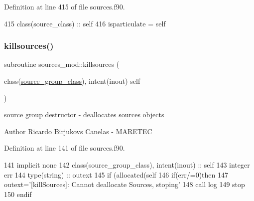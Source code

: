 Definition at line 415 of file sources.\+f90.


\begin{DoxyCode}
415     \textcolor{keywordtype}{class}(source\_class) :: self
416     isparticulate = self%
\end{DoxyCode}
\mbox{\label{namespacesources__mod_aee745aa084adcfa41ecfc3469b90aa8e}} 
\subsubsection{\texorpdfstring{killsources()}{killsources()}}
{\footnotesize\ttfamily subroutine sources\+\_\+mod\+::killsources (\begin{DoxyParamCaption}\item[{class(\mbox{\hyperlink{structsources__mod_1_1source__group__class}{source\+\_\+group\+\_\+class}}), intent(inout)}]{self }\end{DoxyParamCaption})\hspace{0.3cm}{\ttfamily [private]}}



source group destructor -\/ deallocates sources objects 

\begin{DoxyAuthor}{Author}
Ricardo Birjukovs Canelas -\/ M\+A\+R\+E\+T\+EC 
\end{DoxyAuthor}


Definition at line 141 of file sources.\+f90.


\begin{DoxyCode}
141     \textcolor{keywordtype}{implicit none}
142     \textcolor{keywordtype}{class}(source\_group\_class), \textcolor{keywordtype}{intent(inout)} :: self
143     \textcolor{keywordtype}{integer} err
144     \textcolor{keywordtype}{type}(string) :: outext
145     \textcolor{keywordflow}{if} (\textcolor{keyword}{allocated}(self%
146     \textcolor{keywordflow}{if}(err/=0)\textcolor{keywordflow}{then}
147         outext=\textcolor{stringliteral}{'[killSources]: Cannot deallocate Sources, stoping'}
148         \textcolor{keyword}{call }log%
149         stop
150 \textcolor{keywordflow}{    endif}
\end{DoxyCode}
\mbox{\label{namespacesources__mod_a683ca7e4aca7a0050aad9f506569fca9}} 
